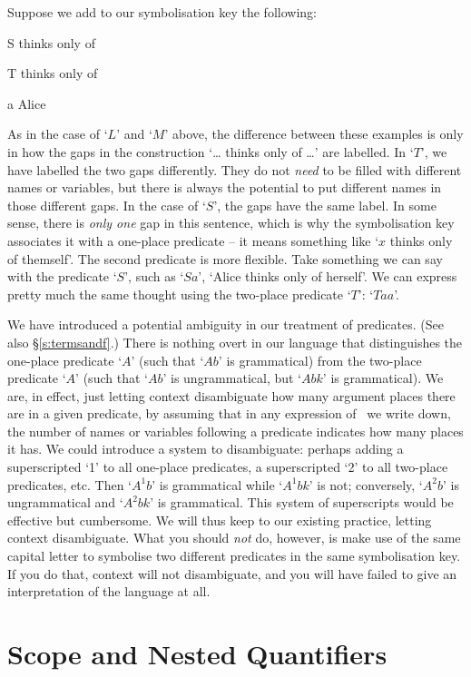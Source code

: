 Suppose we add to our symbolisation key the following:
	\begin{ekey}
		\item[S]  thinks only of 
		\item[T]  thinks only of 
		\item[a] Alice
	\end{ekey}
As in the case of `$L$' and `$M$' above, the difference between these examples is only in how the gaps in the construction `… thinks only of …' are labelled. In `$T$', we have labelled the two gaps differently. They do not \emph{need} to be filled with different names or variables, but there is always the potential to put different names in those different gaps. In the case of `$S$', the gaps have the same label. In some sense, there is \emph{only one} gap in this sentence, which is why the symbolisation key associates it with a one-place predicate – it means something like `$x$ thinks only of themself'. The second predicate is more flexible. Take something we can say with the predicate `$S$', such as `$Sa$', `Alice thinks only of herself'. We can express pretty much the same thought using the two-place predicate `$T$': `$Taa$'. 


We have introduced a potential ambiguity in our treatment of predicates. (See also §\ref{s:termsandf}.) There is nothing overt in our language that distinguishes the one-place predicate `$A$' (such that `$Ab$' is grammatical) from the two-place predicate `$A$' (such that `$Ab$' is ungrammatical, but `$Abk$' is grammatical). We are, in effect, just letting context disambiguate how many argument places there are in a given predicate, by assuming that in any expression of \FOL\ we write down, the number of names or variables following a predicate indicates how many places it has. We could introduce a system to disambiguate: perhaps adding a superscripted `1' to all one-place predicates, a superscripted `2' to all two-place predicates, etc. Then `$A^{1}b$' is grammatical while `$A^{1}bk$' is not; conversely, `$A^{2}b$' is ungrammatical and `$A^{2}bk$' is grammatical. This system of superscripts would be effective but cumbersome. We will thus keep to our existing practice, letting context disambiguate. What you should \emph{not} do, however, is make use of the same capital letter to symbolise two different predicates in the same symbolisation key. If you do that, context will not disambiguate, and you will have failed to give an interpretation of the language at all. 


\section{Scope and Nested Quantifiers}\label{quan.scope}


